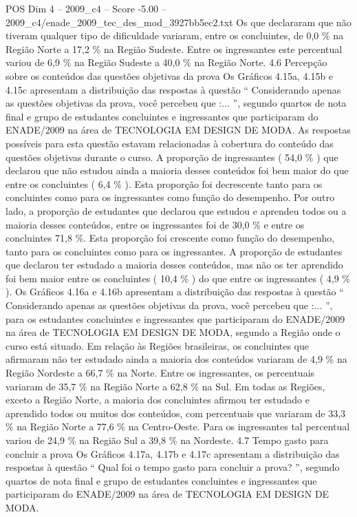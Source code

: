 \begin{textsample}{POS Dim 4 – 2009\_c4 – Score -5.00 – 2009\_c4/enade\_2009\_tec\_des\_mod\_3927bb5ec2.txt}
Os que declararam que não tiveram qualquer tipo de dificuldade variaram, entre os concluintes, de 0,0 \% na Região Norte a 17,2 \% na Região Sudeste.
Entre os ingressantes este percentual variou de 6,9 \% na Região Sudeste a 40,0 \% na Região Norte. 4.6 Percepção sobre os conteúdos das questões objetivas da prova Os Gráficos 4.15a, 4.15b e 4.15c apresentam a distribuição das respostas à questão “ Considerando apenas as questões objetivas da prova, você percebeu que :... ”, segundo quartos de nota final e grupo de estudantes concluintes e ingressantes que participaram do ENADE/2009 na área de TECNOLOGIA EM DESIGN DE MODA.
As respostas possíveis para esta questão estavam relacionadas à cobertura do conteúdo das questões objetivas durante o curso.
A proporção de ingressantes ( 54,0 \% ) que declarou que não estudou ainda a maioria desses conteúdos foi bem maior do que entre os concluintes ( 6,4 \% ).
Esta proporção foi decrescente tanto para os concluintes como para os ingressantes como função do desempenho.
Por outro lado, a proporção de estudantes que declarou que estudou e aprendeu todos ou a maioria desses conteúdos, entre os ingressantes foi de 30,0 \% e entre os concluintes 71,8 \%.
Esta proporção foi crescente como função do desempenho, tanto para os concluintes como para os ingressantes.
A proporção de estudantes que declarou ter estudado a maioria desses conteúdos, mas não os ter aprendido foi bem maior entre os concluintes ( 10,4 \% ) do que entre os ingressantes ( 4,9 \% ).
Os Gráficos 4.16a e 4.16b apresentam a distribuição das respostas à questão “ Considerando apenas as questões objetivas da prova, você percebeu que :... ”, para os estudantes concluintes e ingressantes que participaram do ENADE/2009 na área de TECNOLOGIA EM DESIGN DE MODA, segundo a Região onde o curso está situado.
Em relação às Regiões brasileiras, os concluintes que afirmaram não ter estudado ainda a maioria dos conteúdos variaram de 4,9 \% na Região Nordeste a 66,7 \% na Norte.
Entre os ingressantes, os percentuais variaram de 35,7 \% na Região Norte a 62,8 \% na Sul.
Em todas as Regiões, exceto a Região Norte, a maioria dos concluintes afirmou ter estudado e aprendido todos ou muitos dos conteúdos, com percentuais que variaram de 33,3 \% na Região Norte a 77,6 \% na Centro-Oeste.
Para os ingressantes tal percentual variou de 24,9 \% na Região Sul a 39,8 \% na Nordeste. 4.7 Tempo gasto para concluir a prova Os Gráficos 4.17a, 4.17b e 4.17c apresentam a distribuição das respostas à questão “ Qual foi o tempo gasto para concluir a prova? ”, segundo quartos de nota final e grupo de estudantes concluintes e ingressantes que participaram do ENADE/2009 na área de TECNOLOGIA EM DESIGN DE MODA.

\end{textsample}
